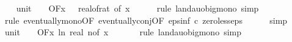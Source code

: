 \begin{isabellebody}
\isanewline
\ \ \isamarkupfalse%
\ unit{\isacharunderscore}{\kern0pt}{}{\isacharcolon}{\kern0pt}\ {\isachardoublequoteopen}{\isacharparenleft}{\kern0pt}{\isasymlambda}{\isacharunderscore}{\kern0pt}{\isachardot}{\kern0pt}\ {}{\isacharparenright}{\kern0pt}\ {\isasymin}\ O{\isacharbrackleft}{\kern0pt}{\isacharquery}{\kern0pt}F{\isacharbrackright}{\kern0pt}{\isacharparenleft}{\kern0pt}{\isasymlambda}x{\isachardot}{\kern0pt}\ {}\ {\isacharslash}{\kern0pt}\ real{\isacharunderscore}{\kern0pt}of{\isacharunderscore}{\kern0pt}rat\ {\isacharparenleft}{\kern0pt}{\isasymepsilon}{\isacharunderscore}{\kern0pt}of\ x{\isacharparenright}{\kern0pt}{\isacharparenright}{\kern0pt}{\isachardoublequoteclose}\isanewline
\ \ \ \ \isamarkupfalse%
\ {\isacharparenleft}{\kern0pt}rule\ landau{\isacharunderscore}{\kern0pt}o{\isachardot}{\kern0pt}big{\isacharunderscore}{\kern0pt}mono{\isacharcomma}{\kern0pt}\ simp{\isacharparenright}{\kern0pt}\isanewline
\ \ \ \ \isamarkupfalse%
\ {\isacharparenleft}{\kern0pt}rule\ eventually{\isacharunderscore}{\kern0pt}mono{\isacharbrackleft}{\kern0pt}OF\ eventually{\isacharunderscore}{\kern0pt}conj{\isacharbrackleft}{\kern0pt}OF\ eps{\isacharunderscore}{\kern0pt}inf{\isacharbrackleft}{\kern0pt}\ c{\isacharequal}{\kern0pt}{\isachardoublequoteopen}{}{\isachardoublequoteclose}{\isacharbrackright}{\kern0pt}\ zero{\isacharunderscore}{\kern0pt}less{\isacharunderscore}{\kern0pt}eps{\isacharbrackright}{\kern0pt}{\isacharbrackright}{\kern0pt}{\isacharparenright}{\kern0pt}\isanewline
\ \ \ \ \isamarkupfalse%
\ simp\isanewline
\isanewline
\ \ \isamarkupfalse%
\ unit{\isacharunderscore}{\kern0pt}{}{\isacharcolon}{\kern0pt}\ {\isachardoublequoteopen}{\isacharparenleft}{\kern0pt}{\isasymlambda}{\isacharunderscore}{\kern0pt}{\isachardot}{\kern0pt}\ {}{\isacharparenright}{\kern0pt}\ {\isasymin}\ O{\isacharbrackleft}{\kern0pt}{\isacharquery}{\kern0pt}F{\isacharbrackright}{\kern0pt}{\isacharparenleft}{\kern0pt}{\isasymlambda}x{\isachardot}{\kern0pt}\ ln\ {\isacharparenleft}{\kern0pt}real\ {\isacharparenleft}{\kern0pt}n{\isacharunderscore}{\kern0pt}of\ x{\isacharparenright}{\kern0pt}{\isacharparenright}{\kern0pt}{\isacharparenright}{\kern0pt}{\isachardoublequoteclose}\ \isanewline
\ \ \ \ \isamarkupfalse%
\ {\isacharparenleft}{\kern0pt}rule\ landau{\isacharunderscore}{\kern0pt}o{\isachardot}{\kern0pt}big{\isacharunderscore}{\kern0pt}mono{\isacharcomma}{\kern0pt}\ simp{\isacharparenright}{\kern0pt}\isanewline

\end{isabellebody}
